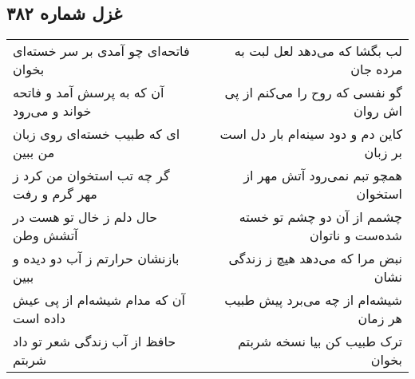 \begin{center}
\section*{غزل شماره ۳۸۲}
\label{sec:sh382}
\begin{longtable}{l p{0.5cm} r}
فاتحه‌ای چو آمدی بر سر خسته‌ای بخوان
&&
لب بگشا که می‌دهد لعل لبت به مرده جان
\\
آن که به پرسش آمد و فاتحه خواند و می‌رود
&&
گو نفسی که روح را می‌کنم از پی اش روان
\\
ای که طبیب خسته‌ای روی زبان من ببین
&&
کاین دم و دود سینه‌ام بار دل است بر زبان
\\
گر چه تب استخوان من کرد ز مهر گرم و رفت
&&
همچو تبم نمی‌رود آتش مهر از استخوان
\\
حال دلم ز خال تو هست در آتشش وطن
&&
چشمم از آن دو چشم تو خسته شده‌ست و ناتوان
\\
بازنشان حرارتم ز آب دو دیده و ببین
&&
نبض مرا که می‌دهد هیچ ز زندگی نشان
\\
آن که مدام شیشه‌ام از پی عیش داده است
&&
شیشه‌ام از چه می‌برد پیش طبیب هر زمان
\\
حافظ از آب زندگی شعر تو داد شربتم
&&
ترک طبیب کن بیا نسخه شربتم بخوان
\\
\end{longtable}
\end{center}

